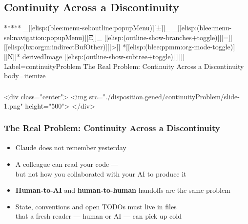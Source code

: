 \begin{whenOrg}
\section{Continuity Across a Discontinuity}

\begin{whenOrg}
*****  _[[elisp:(blee:menu-sel:outline:popupMenu)][±]]_ _[[elisp:(blee:menu-sel:navigation:popupMenu)][Ξ]]_ [[elisp:(outline-show-branches+toggle)][|=]] [[elisp:(bx:orgm:indirectBufOther)][|>]] *[[elisp:(blee:ppmm:org-mode-toggle)][|N]]*  derivedImage [[elisp:(outline-show-subtree+toggle)][||]] Label=continuityProblem The Real Problem: Continuity Across a Discontinuity body=itemize
\end{whenOrg}

\begin{htmlonly}

\begin{frame}[fragile,plain,label=continuityProblem]
    \frametitle{}
    \framesubtitle{}
    \begin{rawhtml}
<div class="center">
<img src="./disposition.gened/continuityProblem/slide-1.png" height="500">
</div>
    \end{rawhtml}
\end{frame}
\end{htmlonly}

\begin{verblatex}

\begin{frame}[fragile,plain,label=continuityProblem]
    \frametitle{The Real Problem: Continuity Across a Discontinuity}
    \framesubtitle{}

\begin{itemize}
  \item Claude does not remember yesterday
  \item A colleague can read your code ---\\
    but not how you collaborated with your AI to produce it
  \item \textbf{Human-to-AI} and \textbf{human-to-human} handoffs are the same problem
  \item State, conventions and open TODOs must live in files\\
    that a fresh reader --- human or AI --- can pick up cold
  \end{itemize}


\end{frame}
\end{verblatex}
\end{whenOrg}
